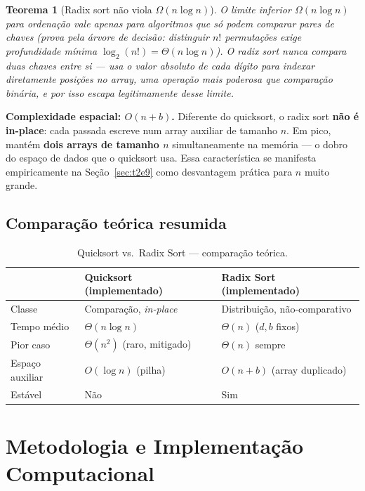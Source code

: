 \documentclass[11pt,a4paper]{article}
\renewcommand{\_}{\underscoreoriginal\allowbreak}
\newtheorem*{teorema}{Teorema}
\begin{document}
\begin{teorema}[Radix sort não viola $\Omega(n\log n)$]
O limite inferior $\Omega(n\log n)$ para ordenação vale apenas para
algoritmos que só podem comparar pares de chaves (prova pela árvore de
decisão: distinguir $n!$ permutações exige profundidade mínima
$\log_2(n!) = \Theta(n\log n)$). O radix sort nunca compara duas chaves
entre si --- usa o valor absoluto de cada dígito para indexar
diretamente posições no array, uma operação mais poderosa que
comparação binária, e por isso escapa legitimamente desse limite.
\end{teorema}

\textbf{Complexidade espacial: $O(n+b)$.} Diferente do quicksort, o
radix sort \textbf{não é in-place}: cada passada escreve num array
auxiliar de tamanho $n$. Em pico, mantém \textbf{dois arrays de tamanho
$n$} simultaneamente na memória --- o dobro do espaço de dados que o
quicksort usa. Essa característica se manifesta empiricamente na
Seção~\ref{sec:t2e9} como desvantagem prática para $n$ muito grande.

\subsection{Comparação teórica resumida}

\begin{table}[H]
\centering
\caption{Quicksort vs.\ Radix Sort --- comparação teórica.}
\begin{tabular}{l l l}
\toprule
\rowcolor{tablehead}
 & Quicksort (implementado) & Radix Sort (implementado)\\
\midrule
Classe & Comparação, \emph{in-place} & Distribuição, não-comparativo\\
Tempo médio & $\Theta(n\log n)$ & $\Theta(n)$ ($d,b$ fixos)\\
Pior caso & $\Theta(n^2)$ (raro, mitigado) & $\Theta(n)$ sempre\\
Espaço auxiliar & $O(\log n)$ (pilha) & $O(n+b)$ (array duplicado)\\
Estável & Não & Sim\\
\bottomrule
\end{tabular}
\end{table}

\section{Metodologia e Implementação Computacional}
\end{document}
